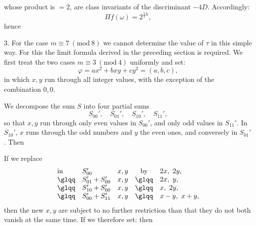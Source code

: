 whose product is $= 2$, are class invariants of the discriminant $-4D$.
Accordingly:
\[
\Pi f(\omega) = 2^{\frac{1}{3}h},
\]
hence

3. For the case $m \equiv 7\ (\mathrm{mod}\ 8)$ we cannot
determine the value of $\tau$ in this simple way. For this the limit
formula derived in the preceding section is required. We first treat
the two cases $m \equiv 3\ (\mathrm{mod}\ 4)$ uniformly and set:
\[
\varphi = ax^2 + bxy + cy^2 = (a,b,c),
\]
in which $x, y$ run through all integer values, with the exception of
the combination $0, 0$.

We decompose the sum $S$ into four partial sums
\[
S_{00}', \quad S_{01}', \quad S_{10}', \quad S_{11}',
\]
so that $x, y$ run through only even values in $S_{00}'$, and only odd
values in $S_{11}'$. In $S_{10}'$, $x$ runs through the odd numbers and
$y$ the even ones, and conversely in $S_{01}'$. Then

If we replace
\[
\begin{array}{l@{\quad}l@{\quad}l@{\quad}c@{\quad}l}
\text{in} & S_{00}' & x,y & \text{by} & 2x,\ 2y,\\
\text{\glqq} & S_{01}'+S_{00}' & x,y & \text{\glqq} & 2x,\ y,\\
\text{\glqq} & S_{10}'+S_{00}' & x,y & \text{\glqq} & x,\ 2y,\\
\text{\glqq} & S_{00}'+S_{11}' & x,y & \text{\glqq} & x-y,\ x+y,
\end{array}
\]
then the new $x, y$ are subject to no further restriction than that they
do not both vanish at the same time. If we therefore set:
then
